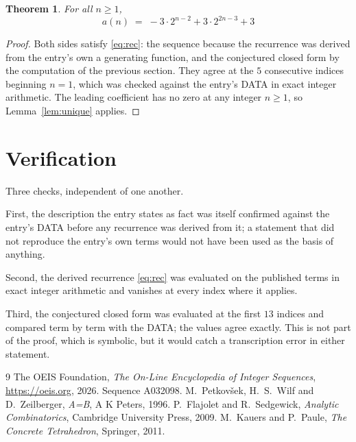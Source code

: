 \documentclass[11pt,a4paper]{article}
\theoremstyle{plain}
\newtheorem{theorem}{Theorem}
\theoremstyle{definition}
\begin{document}
\begin{theorem}
For all $n\ge 1$,
\[
a(n) \;=\; - 3 \cdot 2^{n - 2} + 3 \cdot 2^{2 n - 3} + 3
\]
\end{theorem}

\begin{proof}
Both sides satisfy \eqref{eq:rec}: the sequence because the recurrence was derived from
the entry's own a generating function, and the conjectured closed form by the computation of the
previous section. They agree at the $5$ consecutive indices beginning
$n=1$, which was checked against the entry's DATA in exact integer arithmetic.
The leading coefficient has no zero at any integer $n\ge1$, so
Lemma~\ref{lem:unique} applies.
\end{proof}

\section{Verification}

Three checks, independent of one another.

First, the description the entry states as fact was itself confirmed against the entry's
DATA before any recurrence was derived from it; a statement that did not reproduce the
entry's own terms would not have been used as the basis of anything.

Second, the derived recurrence \eqref{eq:rec} was evaluated on the published terms in
exact integer arithmetic and vanishes at every index where it applies.

Third, the conjectured closed form was evaluated at the first $13$ indices and
compared term by term with the DATA; the values agree exactly. This is not part of the
proof, which is symbolic, but it would catch a transcription error in either statement.

\begin{thebibliography}{9}
 The OEIS Foundation, \emph{The On-Line Encyclopedia of Integer Sequences},
\url{https://oeis.org}, 2026. Sequence A032098.
 M.~Petkov\v{s}ek, H.~S.~Wilf and D.~Zeilberger, \emph{A=B}, A K Peters,
1996.
 P.~Flajolet and R.~Sedgewick, \emph{Analytic Combinatorics}, Cambridge
University Press, 2009.
 M.~Kauers and P.~Paule, \emph{The Concrete Tetrahedron}, Springer, 2011.
\end{thebibliography}
\end{document}
